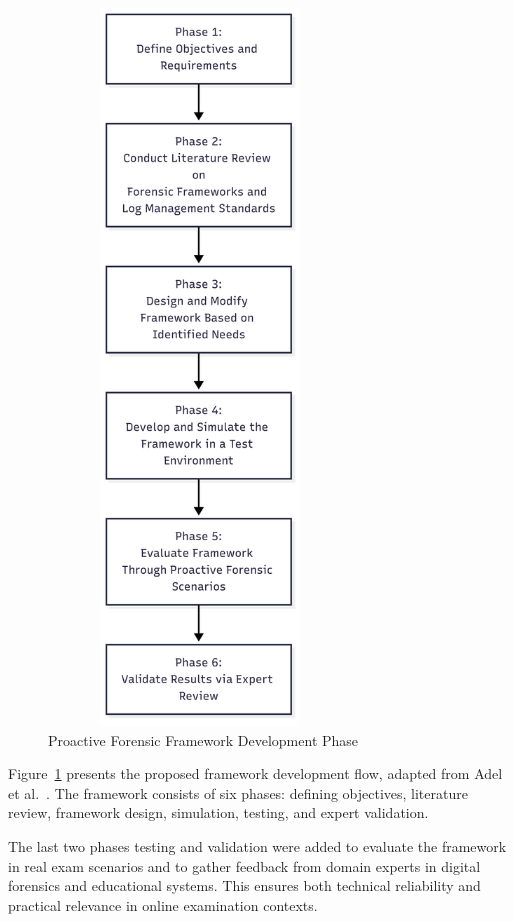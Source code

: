 
\begin{figure}[H]
    \centering
    \includegraphics[width=8cm,height=19cm]{figure/framework-development.png}
    \caption{Proactive Forensic Framework Development Phase \citet{adel2024ethicore}}
    \label{fig:framework-development-phase}
\end{figure}
Figure~\ref{fig:framework-development-phase} presents the proposed framework development flow, adapted from Adel et al.~\cite{adel2024ethicore}. The framework consists of six phases: defining objectives, literature review, framework design, simulation, testing, and expert validation. 

The last two phases testing and validation were added to evaluate the framework in real exam scenarios and to gather feedback from domain experts in digital forensics and educational systems. This ensures both technical reliability and practical relevance in online examination contexts.

